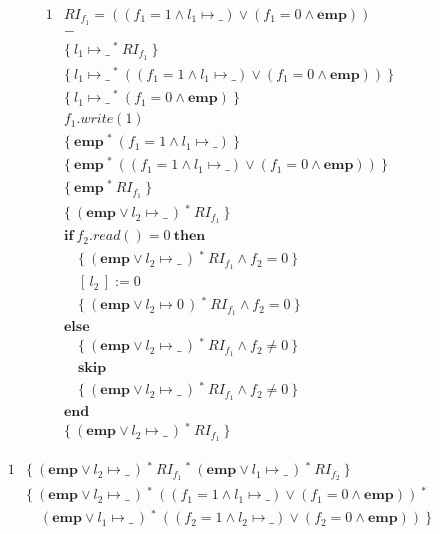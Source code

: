 \documentclass[12pt]{article}
\newcommand{\ifstmt}[3]{
  & \textbf{if}\ #1\ \textbf{then}\ \\
  #2\ \\
  & \textbf{else} \\
  #3\ \\
  & \textbf{end} \\
}
\newcommand{\mt}[2]{
  #1 \mapsto #2
}
\newcommand{\sepcon}[2]{
  #1\ ^*\ #2
}
\newcommand{\emp}{
  \textbf{emp}
}
\newcommand{\riftwofst}{
  (f_2 = 1 \land \mt{l_2}{\_})
}
\newcommand{\riftwosnd}{
  ( f_2 = 0 \land \emp)
}
\newcommand{\riftwo}{
  (\riftwofst \lor \riftwosnd)
}
\newcommand{\rifonefst}{
  (f_1 = 1 \land \mt{l_1}{\_})
}
\newcommand{\rifonesnd}{
  ( f_1 = 0 \land \emp)
}
\newcommand{\rifone}{
  (\rifonefst \lor \rifonesnd)
}
\begin{document}
\begin{alignat*}{1}
  & RI_{f_1} = \rifone \\
  & - \\
  & \{\ \sepcon{\mt{l_1}{\_}}{RI_{f_1}}\ \} \\
  & \{\ \sepcon{\mt{l_1}{\_}}{\rifone}\ \} \\
  & \{\ \sepcon{\mt{l_1}{\_}}{\rifonesnd}\ \} \\
  &  f_1.write( 1 ) \\
  & \{\ \sepcon{\emp}{\rifonefst} \ \} \\
  & \{\ \sepcon{\emp}{\rifone} \ \} \\
  & \{\ \sepcon{\emp}{RI_{f_1}} \ \} \\
  & \{\ \sepcon{(\emp \lor \mt{l_2}{\_}\,)}{RI_{f_1}}\ \} \\
  \ifstmt{
    f_2.read() = 0
  }{
    & \quad \{\ \sepcon{(\emp \lor \mt{l_2}{\_}\,)}{RI_{f_1}} \land f_2 = 0\ \} \\
    & \quad [\,l_2\,] := 0 \\
    & \quad \{\
    \sepcon{
      (\emp \lor \mt{l_2}{0}\,)
    }{
      RI_{f_1}
    }
    \land f_2 = 0\ \}
  }{
    & \quad \{\
    \sepcon{
      (\emp \lor \mt{l_2}{\_}\,)
    }{
      RI_{f_1}
    }
    \land f_2 \neq 0\ \} \\
    & \quad \textbf{skip} \\
    & \quad \{\
    \sepcon{
      (\emp \lor \mt{l_2}{\_}\,)
    }{
      RI_{f_1}
    }
    \land f_2 \neq 0\ \}
  }
  & \{\ \sepcon{ (\emp \lor \mt{l_2}{\_}\,) }{ RI_{f_1}} \ \}
\end{alignat*}

\newpage

\begin{alignat*}{1}
  & \{\
  \sepcon{
    \sepcon{ (\emp \lor \mt{l_2}{\_}\,) }{ RI_{f_1}}
  }{
    \sepcon{ (\emp \lor \mt{l_1}{\_}\,) }{ RI_{f_2} }
  }
  \ \} \\
  & \{\
  \sepcon{
    \sepcon{ (\emp \lor \mt{l_2}{\_}\,) }{\rifone}
  }{
    \\ & \quad \sepcon{ (\emp \lor \mt{l_1}{\_}\,) }{\riftwo}
  }\ \}
\end{alignat*}
\end{document}
